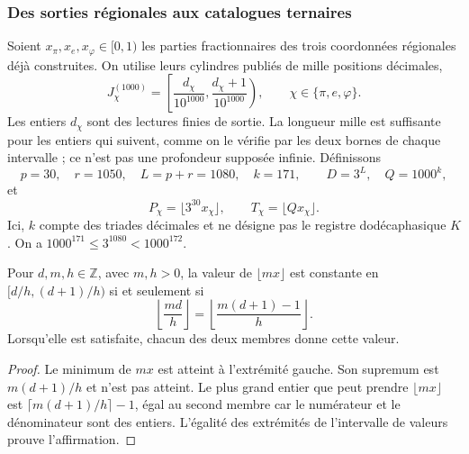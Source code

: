 \subsubsection{Des sorties régionales aux catalogues ternaires}

Soient \(x_\pi,x_e,x_\varphi\in[0,1)\) les parties fractionnaires des
trois coordonnées régionales déjà construites. On utilise leurs cylindres
publiés de mille positions décimales,
\[
 J_\chi^{(1000)}=
 \left[\frac{d_\chi}{10^{1000}},
       \frac{d_\chi+1}{10^{1000}}\right),
 \qquad \chi\in\{\pi,e,\varphi\}.
\]
Les entiers \(d_\chi\) sont des lectures finies de sortie. La longueur mille
est suffisante pour les entiers qui suivent, comme on le vérifie par les
deux bornes de chaque intervalle ; ce n'est pas une profondeur supposée infinie.
Définissons
\begin{equation}
 p=30,\quad r=1050,\quad L=p+r=1080,\quad k=171,
 \qquad D=3^L,\quad Q=1000^k,
 \label{x_reciprocidad:censo:parametros}
\end{equation}
et
\[
 P_\chi=\lfloor3^{30}x_\chi\rfloor,\qquad
 T_\chi=\lfloor Qx_\chi\rfloor.
\]
Ici, \(k\) compte des triades décimales et ne désigne pas le registre dodécaphasique \(K\). On a \(1000^{171}\leq3^{1080}<1000^{172}\).

\begin{lemma}
\label{x_reciprocidad:censo:estabilidad}
Pour \(d,m,h\in\mathbb Z\), avec \(m,h>0\), la valeur de
\(\lfloor mx\rfloor\) est constante en \([d/h,(d+1)/h)\) si et seulement si
\begin{equation}
 \left\lfloor\frac{md}{h}\right\rfloor
 =\left\lfloor\frac{m(d+1)-1}{h}\right\rfloor.
 \label{x_reciprocidad:censo:prueba-estabilidad}
\end{equation}
Lorsqu'elle est satisfaite, chacun des deux membres donne cette valeur.
\end{lemma}
\begin{proof}
Le minimum de \(mx\) est atteint à l'extrémité gauche. Son supremum
est \(m(d+1)/h\) et n'est pas atteint. Le plus grand entier que peut prendre
\(\lfloor mx\rfloor\) est
\(\lceil m(d+1)/h\rceil-1\), égal au second membre car
le numérateur et le dénominateur sont des entiers. L'égalité des extrémités
de l'intervalle de valeurs prouve l'affirmation.
\end{proof}

